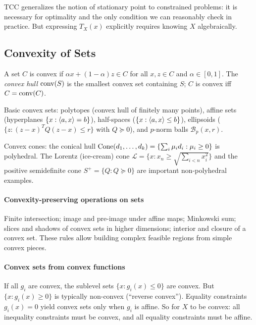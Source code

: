 TCC generalizes the notion of stationary point to constrained problems: it is necessary for optimality and the only condition we can reasonably check in practice.
But expressing $T_X(x)$ explicitly requires knowing $X$ algebraically.


\subsection{Convexity of Sets}\label{ssec:convex-sets}

\begin{defn}\label{def:convex-set}
	A set $C$ is convex if $\alpha x + (1-\alpha)z \in C$ for all $x, z \in C$ and $\alpha \in [0,1]$.
	The \textit{convex hull} $\operatorname{conv}(S)$ is the smallest convex set containing $S$; $C$ is convex iff $C = \operatorname{conv}(C)$.
\end{defn}

Basic convex sets: polytopes (convex hull of finitely many points), affine sets (hyperplanes $\{x : \langle a, x\rangle = b\}$), half-spaces ($\{x : \langle a, x\rangle \leq b\}$), ellipsoids ($\{z : (z-x)^T Q (z-x) \leq r\}$ with $Q \succeq 0$), and $p$-norm balls $\mathcal{B}_p(x, r)$.

Convex cones: the conical hull $\operatorname{Cone}(d_1, \dots, d_k) = \{\sum_i \mu_i d_i : \mu_i \geq 0\}$ is polyhedral.
The Lorentz (ice-cream) cone $\mathcal{L} = \{x : x_n \geq \sqrt{\sum_{i<n} x_i^2}\}$ and the positive semidefinite cone $S^+ = \{Q : Q \succeq 0\}$ are important non-polyhedral examples.

\paragraph{Convexity-preserving operations on sets}

Finite intersection; image and pre-image under affine maps; Minkowski sum; slices and shadows of convex sets in higher dimensions; interior and closure of a convex set.
These rules allow building complex feasible regions from simple convex pieces.

\paragraph{Convex sets from convex functions}

If all $g_i$ are convex, the sublevel sets $\{x : g_i(x) \leq 0\}$ are convex.
But $\{x : g_i(x) \geq 0\}$ is typically non-convex (``reverse convex'').
Equality constraints $g_i(x) = 0$ yield convex sets only when $g_i$ is affine.
So for $X$ to be convex: all inequality constraints must be convex, and all equality constraints must be affine.


